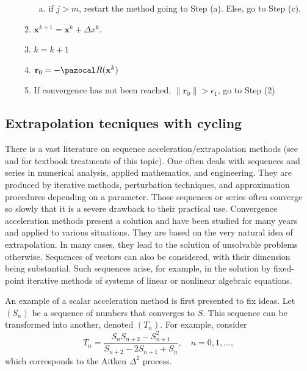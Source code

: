 \begin{framedbox}[htbp]
\begin{center}
\begin{minipage}{0.9\textwidth}
\begin{enumerate}[(i)]
\begin{enumerate}[(1)]
\begin{enumerate}[(a)]
        \item if \(j>m\), restart the method going to Step (a). Else, go to Step (c).
      \end{enumerate}
    \item \(\mathbf x^{k+1} = \mathbf x^k + \Delta x^k\).
    \item \(k=k+1\)
    \item \(\mathbf r_0 = -\pazocal R(\mathbf x^k)\)
    \item If convergence has not been reached, \(\|\mathbf r_0\| > \epsilon_1\), go to Step (2)
    \end{enumerate}
    \end{enumerate}
    \end{minipage}
  \end{center}
\end{framedbox}

\subsection{Extrapolation tecniques with cycling} \label{sec:vector_extrapolation}

There is a vast literature on sequence acceleration/extrapolation methods (see  \cite{brezinski_extrapolation_2013} and \cite{sidi_vector_2017} for textbook treatments of this topic).
One often deals with sequences and series in numerical analysis, applied mathematics, and engineering.
They are produced by iterative methods, perturbation techniques, and approximation procedures depending on a parameter.
Those sequences or series often converge so slowly that it is a severe drawback to their practical use.
Convergence acceleration methods present a solution and have been studied for many years and applied to various situations.
They are based on the very natural idea of extrapolation.
In many cases, they lead to the solution of unsolvable problems otherwise.
Sequences of vectors can also be considered, with their dimension being substantial.
Such sequences arise, for example, in the solution by fixed-point iterative methods of systems of linear or nonlinear algebraic equations.

An example of a scalar acceleration method is first presented to fix ideas.
Let \((S_n)\) be a sequence of numbers that converges to \(S\).
This sequence can be transformed into another, denoted \((T_n)\).
For example, consider
\begin{equation}
  T_n = \frac{S_n S_{n+2} - S^2_{n+1}}{S_{n+2}-2S_{n+1} + S_n},\quad n=0,1,\dots,
\end{equation}
which corresponds to the Aitken \(\Delta^2\) process.


